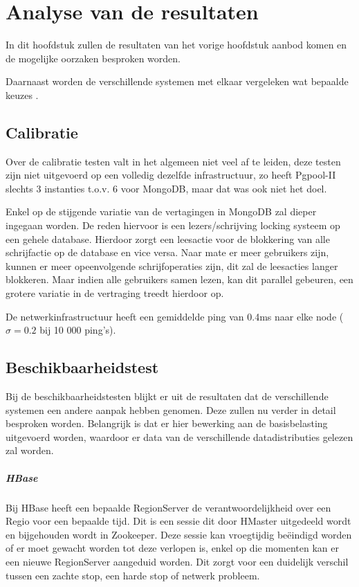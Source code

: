 \chapter{Analyse van de resultaten}
In dit hoofdstuk zullen de resultaten van het vorige hoofdstuk aanbod komen en de mogelijke oorzaken besproken worden. 

Daarnaast worden de verschillende systemen met elkaar vergeleken wat bepaalde keuzes . 
\section{Calibratie}
Over de calibratie testen valt in het algemeen niet veel af te leiden, deze testen zijn niet uitgevoerd op een volledig dezelfde infrastructuur, zo heeft Pgpool-II slechts 3 instanties t.o.v. 6 voor MongoDB, maar dat was ook niet het doel. 

Enkel op de stijgende variatie van de vertagingen in MongoDB zal dieper ingegaan worden. De reden hiervoor is een lezers/schrijving locking systeem op een gehele database\cite{mongodb-concurrency}. Hierdoor zorgt een leesactie voor de blokkering van alle schrijfactie op de database en vice versa. Naar mate er meer gebruikers zijn, kunnen er meer opeenvolgende schrijfoperaties zijn, dit zal de leesacties langer blokkeren. Maar indien alle gebruikers samen lezen, kan dit parallel gebeuren, een grotere variatie in de vertraging treedt hierdoor op. 

De netwerkinfrastructuur heeft een gemiddelde ping van 0.4ms naar elke node ($\sigma = 0.2$ bij 10 000 ping's). 

\section{Beschikbaarheidstest}
Bij de beschikbaarheidstesten blijkt er uit de resultaten dat de verschillende systemen een andere aanpak hebben genomen. Deze zullen nu verder in detail besproken worden. Belangrijk  is dat er hier bewerking aan de basisbelasting uitgevoerd worden, waardoor er data van de verschillende datadistributies gelezen zal worden. 

\paragraph{HBase} Bij HBase heeft een bepaalde RegionServer de verantwoordelijkheid over een Regio voor een bepaalde tijd. Dit is een sessie dit door HMaster uitgedeeld wordt en bijgehouden wordt in Zookeeper. Deze sessie kan vroegtijdig beëindigd worden of er moet gewacht worden tot deze verlopen is, enkel op die momenten kan er een nieuwe RegionServer aangeduid worden. Dit zorgt voor een duidelijk verschil tussen een zachte stop, een harde stop of netwerk probleem. 

